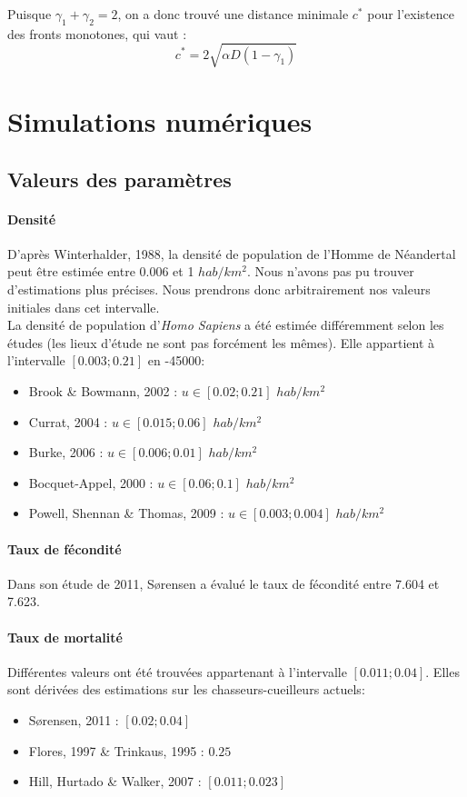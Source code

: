 \documentclass[a4paper,11pt]{article}
\begin{document}
Puisque $\gamma_1 + \gamma_2 = 2$, on a donc trouvé une distance minimale $c^*$ pour l'existence des fronts monotones, qui vaut :
$$c^* = 2\sqrt{\alpha D(1-\gamma_1)}$$


\section{Simulations numériques}
\subsection{Valeurs des paramètres}
\paragraph{Densité} D'après Winterhalder, 1988, la densité de population de l'Homme de Néandertal peut être estimée entre 0.006 et 1 $hab/km^2$. Nous n'avons pas pu trouver d'estimations plus précises. Nous prendrons donc arbitrairement nos valeurs initiales dans cet intervalle. \\
La densité de population d'\textit{Homo Sapiens} a été estimée différemment selon les études (les lieux d'étude ne sont pas forcément les mêmes). Elle appartient à l'intervalle $[0.003;0.21]$ en -45000:
\begin{itemize}
	\item Brook \& Bowmann, 2002 : $u\in[0.02;0.21]$ $hab/km^2$
    \item Currat, 2004 : $u\in[0.015;0.06]$ $hab/km^2$
    \item Burke, 2006 : $u\in[0.006;0.01]$  $hab/km^2$
    \item Bocquet-Appel, 2000 : $u\in[0.06;0.1]$ $hab/km^2$
    \item Powell, Shennan \& Thomas, 2009 : $u\in[0.003;0.004]$ $hab/km^2$
\end{itemize}
\paragraph{Taux de fécondité} Dans son étude de 2011, Sørensen a évalué le taux de fécondité entre 7.604 et 7.623.
\paragraph{Taux de mortalité} Différentes valeurs ont été trouvées appartenant à l'intervalle $[0.011;0.04]$. Elles sont dérivées des estimations sur les chasseurs-cueilleurs actuels:
\begin{itemize}
	\item Sørensen, 2011 : $[0.02;0.04]$
    \item Flores, 1997 \& Trinkaus, 1995 : $0.25$ 
    \item Hill, Hurtado \& Walker, 2007 : $[0.011;0.023]$
\end{itemize}
\end{document}
